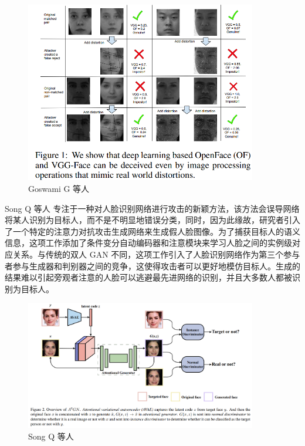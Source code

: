 \begin{figure}[htb]
\centering 
\includegraphics[width=0.90\textwidth]{img/ch4m0.png} 
\caption{ Goswami G 等人 \cite{goswami2018unravelling} }
\label{Test}
\end{figure}

Song Q 等人 \cite{yang2021attacks} 专注于一种对人脸识别网络进行攻击的新颖方法，该方法会误导网络将某人识别为目标人，而不是不明显地错误分类，同时，因为此缘故，研究者引入了一个特定的注意力对抗攻击生成网络来生成假人脸图像。为了捕获目标人的语义信息，这项工作添加了条件变分自动编码器和注意模块来学习人脸之间的实例级对应关系。与传统的双人 GAN 不同，这项工作引入了人脸识别网络作为第三个参与者参与生成器和判别器之间的竞争，这使得攻击者可以更好地模仿目标人。生成的结果难以引起旁观者注意的人脸可以逃避最先进网络的识别，并且大多数人都被识别为目标人。

\begin{figure}[htb]
\centering 
\includegraphics[width=0.90\textwidth]{img/ch4m1.png} 
\caption{ Song Q 等人 \cite{yang2021attacks} }
\label{Test}
\end{figure}

